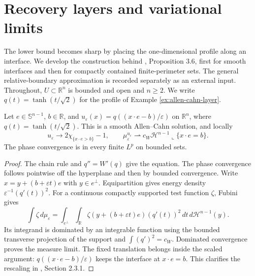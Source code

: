 \chapter{Recovery layers and variational limits}\label{sec:phase-recovery}
The lower bound becomes sharp by placing the one-dimensional profile along an interface. We develop the construction behind \cite{ChAC}, Proposition 3.6, first for smooth interfaces and then for compactly contained finite-perimeter sets. The general relative-boundary approximation is recorded separately as an external input. Throughout, $U\subset\mathbb R^n$ is bounded and open and $n\geq2$. We write $q(t)=\tanh(t/\sqrt2)$ for the profile of Example \ref{ex:allen-cahn-layer}.

\begin{proposition}\label{prop:phase-flat-interface}
Let $e\in\mathbb S^{n-1}$, $b\in\mathbb R$, and $u_\varepsilon(x)=q((x\cdot e-b)/\varepsilon)$ on $\mathbb R^n$, where $q(t)=\tanh(t/\sqrt2)$. This is a smooth Allen--Cahn solution, and locally
\[
 u_\varepsilon\to2\chi_{\{x\cdot e>b\}}-1,\qquad
 \mu_\varepsilon^{u_\varepsilon}\rightharpoonup
 c_W\mathcal H^{n-1}\llcorner\{x\cdot e=b\}.
\]
The phase convergence is in every finite $L^p$ on bounded sets.
\end{proposition}
\begin{proof}
The chain rule and $q''=W'(q)$ give the equation. The phase convergence follows pointwise off the hyperplane and then by bounded convergence. Write $x=y+(b+\varepsilon t)e$ with $y\in e^\perp$. Equipartition gives energy density $\varepsilon^{-1}(q'(t))^2$. For a continuous compactly supported test function $\zeta$, Fubini gives
\[
 \int\zeta\,d\mu_\varepsilon
 =\int_{e^\perp}\int_{\mathbb R}
 \zeta(y+(b+\varepsilon t)e)(q'(t))^2\,dt\,d\mathcal H^{n-1}(y).
\]
Its integrand is dominated by an integrable function using the bounded transverse projection of the support and $\int(q')^2=c_W$. Dominated convergence proves the measure limit. The fixed translation belongs inside the scaled argument: $q((x\cdot e-b)/\varepsilon)$ keeps the interface at $x\cdot e=b$. This clarifies the rescaling in \cite{ChAC}, Section 2.3.1.
\end{proof}

